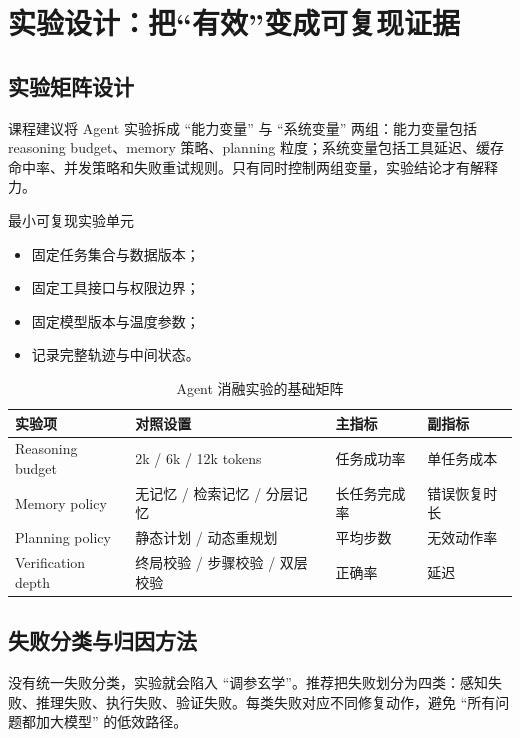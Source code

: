 \section{实验设计：把“有效”变成可复现证据}

\subsection{实验矩阵设计}
课程建议将 Agent 实验拆成 ``能力变量'' 与 ``系统变量'' 两组：能力变量包括 reasoning budget、memory 策略、planning 粒度；系统变量包括工具延迟、缓存命中率、并发策略和失败重试规则。只有同时控制两组变量，实验结论才有解释力。

\begin{knowledgebox}{最小可复现实验单元}
\begin{itemize}
    \item 固定任务集合与数据版本；
    \item 固定工具接口与权限边界；
    \item 固定模型版本与温度参数；
    \item 记录完整轨迹与中间状态。
\end{itemize}
\end{knowledgebox}

\begin{table}[H]
\centering
\begin{tabular}{p{3.1cm}p{3.3cm}p{2.7cm}p{2.2cm}}
\toprule
\textbf{实验项} & \textbf{对照设置} & \textbf{主指标} & \textbf{副指标} \\
\midrule
Reasoning budget & 2k / 6k / 12k tokens & 任务成功率 & 单任务成本 \\
Memory policy & 无记忆 / 检索记忆 / 分层记忆 & 长任务完成率 & 错误恢复时长 \\
Planning policy & 静态计划 / 动态重规划 & 平均步数 & 无效动作率 \\
Verification depth & 终局校验 / 步骤校验 / 双层校验 & 正确率 & 延迟 \\
\bottomrule
\end{tabular}
\caption{Agent 消融实验的基础矩阵}
\end{table}

\subsection{失败分类与归因方法}
没有统一失败分类，实验就会陷入 ``调参玄学''。推荐把失败划分为四类：感知失败、推理失败、执行失败、验证失败。每类失败对应不同修复动作，避免 ``所有问题都加大模型'' 的低效路径。


